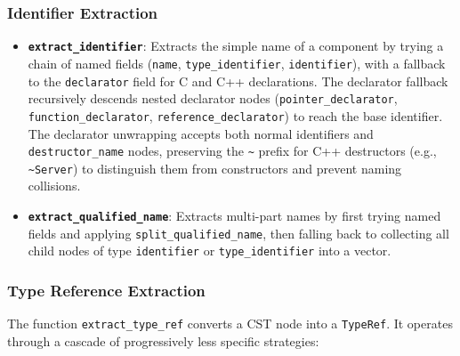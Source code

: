\subsubsection{Identifier Extraction}

\begin{itemize}
  \item \textbf{\texttt{extract\_identifier}}: Extracts the simple
    name of a component by trying a chain of named fields
    (\texttt{name}, \texttt{type\_identifier}, \texttt{identifier}),
    with a fallback to the \texttt{declarator} field for C and C++
    declarations. The declarator fallback recursively descends nested
    declarator nodes (\texttt{pointer\_decla}\-\texttt{rator},
    \texttt{function\_declarator}, \texttt{reference\_declarator}) to
    reach the base identifier. The declarator unwrapping accepts
    both normal identifiers and \texttt{destructor\_name} nodes, preserving
    the \texttt{\textasciitilde} prefix for C++ destructors (e.g.,
    \texttt{\textasciitilde Server})
    to distinguish them from constructors and prevent naming collisions.
  \item \textbf{\texttt{extract\_qualified\_name}}: Extracts
    multi-part names by first trying \linebreak named fields and applying
    \texttt{split\_quali}\-\texttt{fied\_name}, then falling back to collecting
    all child nodes of type \texttt{identifier} or
    \texttt{type\_identifier} into a vector.
\end{itemize}

\subsubsection{Type Reference Extraction}

The function \texttt{extract\_type\_ref} converts a CST node into a
\texttt{TypeRef}. It operates through a cascade of progressively less
specific strategies:

